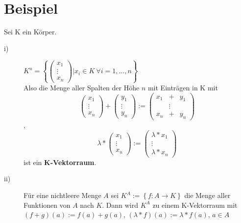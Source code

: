 \documentclass{scrbook}
\begin{document}
\section{Beispiel}
Sei K ein Körper.
\begin{description}
\item[i)]\(K^n=
\left\{
\left(
\begin{array}{c}
x_1\\
\vdots\\
x_n
\end{array}
\right)| x_i\in K \ \forall i=1,...,n
\right\}\)\\
Also die Menge aller Spalten der Höhe $n$ mit Einträgen in K mit 
\[
\left(
\begin{array}{c}
x_1\\
\vdots\\
x_n
\end{array}
\right)+
\left(
\begin{array}{c}
y_1\\
\vdots\\
y_n
\end{array}
\right)
:=
\left(
\begin{array}{ccc}
x_1&+&y_1\\
&\vdots\\
x_n&+&y_n
\end{array}
\right)
\],
\[
\lambda * \left(
\begin{array}{c}
x_1\\
\vdots\\
x_n
\end{array}
\right):=
\left(
\begin{array}{c}
\lambda*x_1\\
\vdots\\
\lambda*x_n
\end{array}
\right)
\]
ist ein \textbf{K-Vektorraum}.
\item[ii)]Für eine nichtleere Menge \(A\) sei \(K^A := \left\{ f:A \rightarrow K\right\}\) die Menge aller Funktionen von \(A\) nach \(K\). Dann wird \(K^A\) zu einem K-Vektorraum mit \((f+g)(a):=f(a)+g(a)\), \((\lambda *f)(a):=\lambda *f(a)\), \(a\in A\)
\end{description}
\end{document}
